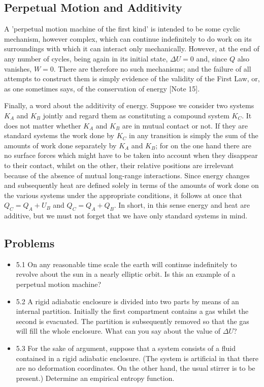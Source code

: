 \documentclass{article}
\theoremstyle{definition}
\begin{document}
\subsection{Perpetual Motion and Additivity}
A 'perpetual motion machine of the first kind' is intended to be some cyclic mechanism, however complex, which can continue indefinitely to do work on its surroundings with which it can interact only mechanically. However, at the end of any number of cycles, being again in its initial state, \(\Delta U = 0\) and, since \(Q\) also vanishes, \(W = 0\). There are therefore no such mechanisms; and the failure of all attempts to construct them is simply evidence of the validity of the First Law, or, as one sometimes says, of the conservation of energy [Note 15].

Finally, a word about the additivity of energy. Suppose we consider two systems \(K_A\) and \(K_B\) jointly and regard them as constituting a compound system \(K_C\). It does not matter whether \(K_A\) and \(K_B\) are in mutual contact or not. If they are standard systems the work done by \(K_C\) in any transition is simply the sum of the amounts of work done separately by \(K_A\) and \(K_B\); for on the one hand there are no surface forces which might have to be taken into account when they disappear to their contact, whilst on the other, their relative positions are irrelevant because of the absence of mutual long-range interactions. Since energy changes and subsequently heat are defined solely in terms of the amounts of work done on the various systems under the appropriate conditions, it follows at once that \(Q_C = Q_A + U_B\) and \(Q_C = Q_A + Q_B\). In short, in this sense energy and heat are additive, but we must not forget that we have only standard systems in mind.

\subsection{Problems}
\begin{itemize}
\item 5.1 On any reasonable time scale the earth will continue indefinitely to revolve about the sun in a nearly elliptic orbit. Is this an example of a perpetual motion machine?
\item 5.2 A rigid adiabatic enclosure is divided into two parts by means of an internal partition. Initially the first compartment contains a gas whilst the second is evacuated. The partition is subsequently removed so that the gas will fill the whole enclosure. What can you say about the value of \(\Delta U\)?
\item 5.3 For the sake of argument, suppose that a system consists of a fluid contained in a rigid adiabatic enclosure. (The system is artificial in that there are no deformation coordinates. On the other hand, the usual stirrer is to be present.) Determine an empirical entropy function.
\end{itemize}
\end{document}

